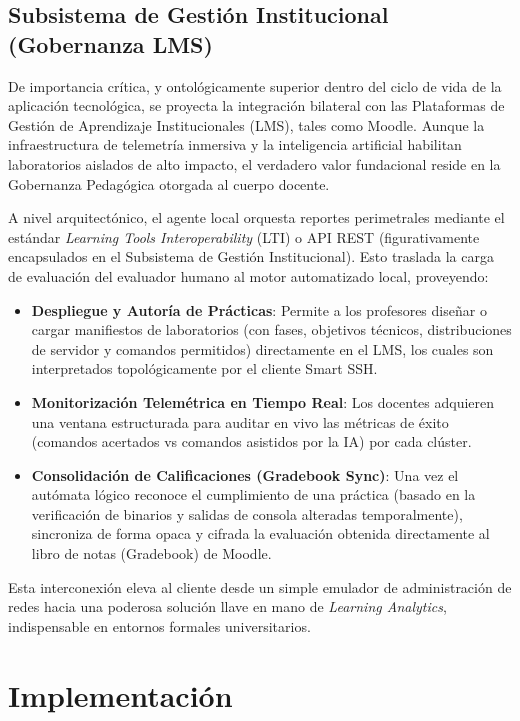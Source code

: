 \documentclass[conference]{IEEEtran} %
\begin{document}
\subsection{Subsistema de Gestión Institucional (Gobernanza LMS)}

De importancia crítica, y ontológicamente superior dentro del ciclo de vida de la aplicación tecnológica, se proyecta la integración bilateral con las Plataformas de Gestión de Aprendizaje Institucionales (LMS), tales como Moodle. Aunque la infraestructura de telemetría inmersiva y la inteligencia artificial habilitan laboratorios aislados de alto impacto, el verdadero valor fundacional reside en la Gobernanza Pedagógica otorgada al cuerpo docente.

A nivel arquitectónico, el agente local orquesta reportes perimetrales mediante el estándar \textit{Learning Tools Interoperability} (LTI) o API REST (figurativamente encapsulados en el Subsistema de Gestión Institucional). Esto traslada la carga de evaluación del evaluador humano al motor automatizado local, proveyendo:
\begin{itemize}
    \item \textbf{Despliegue y Autoría de Prácticas}: Permite a los profesores diseñar o cargar manifiestos de laboratorios (con fases, objetivos técnicos, distribuciones de servidor y comandos permitidos) directamente en el LMS, los cuales son interpretados topológicamente por el cliente Smart SSH.
    \item \textbf{Monitorización Telemétrica en Tiempo Real}: Los docentes adquieren una ventana estructurada para auditar en vivo las métricas de éxito (comandos acertados vs comandos asistidos por la IA) por cada clúster.
    \item \textbf{Consolidación de Calificaciones (Gradebook Sync)}: Una vez el autómata lógico reconoce el cumplimiento de una práctica (basado en la verificación de binarios y salidas de consola alteradas temporalmente), sincroniza de forma opaca y cifrada la evaluación obtenida directamente al libro de notas (Gradebook) de Moodle.
\end{itemize}

Esta interconexión eleva al cliente desde un simple emulador de administración de redes hacia una poderosa solución llave en mano de \textit{Learning Analytics}, indispensable en entornos formales universitarios.

\section{Implementación}
\end{document}
